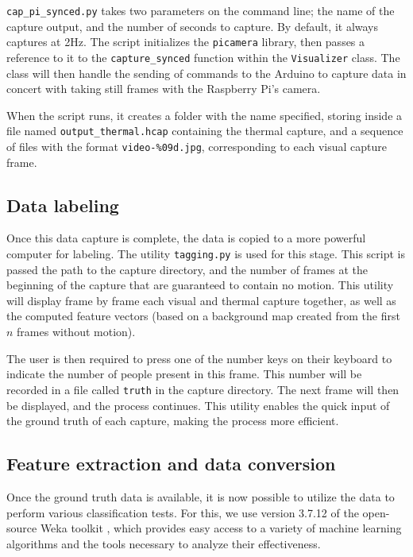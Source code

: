 \documentclass[../thesis/thesis.tex]{subfiles}
\begin{document}
\texttt{cap\_pi\_synced.py} takes two parameters on the command line; the name of the capture output, and the number of seconds to capture. By default, it always captures at 2Hz. The script initializes the \texttt{picamera} library, then passes a reference to it to the \texttt{capture\_synced} function within the \texttt{Visualizer} class. The class will then handle the sending of commands to the Arduino to capture data in concert with taking still frames with the Raspberry Pi's camera.

When the script runs, it creates a folder with the name specified, storing inside a file named \texttt{output\_thermal.hcap} containing the thermal capture, and a sequence of files with the format \texttt{video-\%09d.jpg}, corresponding to each visual capture frame.

\subsection{Data labeling}
Once this data capture is complete, the data is copied to a more powerful computer for labeling. The utility \texttt{tagging.py} is used for this stage. This script is passed the path to the capture directory, and the number of frames at the beginning of the capture that are guaranteed to contain no motion. This utility will display frame by frame each visual and thermal capture together, as well as the computed feature vectors (based on a background map created from the first $n$ frames without motion).

The user is then required to press one of the number keys on their keyboard to indicate the number of people present in this frame. This number will be recorded in a file called \texttt{truth} in the capture directory. The next frame will then be displayed, and the process continues. This utility enables the quick input of the ground truth of each capture, making the process more efficient.

\subsection{Feature extraction and data conversion}

Once the ground truth data is available, it is now possible to utilize the data to perform various classification tests. For this, we use version 3.7.12 of the open-source Weka toolkit \cite{Weka}, which provides easy access to a variety of machine learning algorithms and the tools necessary to analyze their effectiveness.
\end{document}
